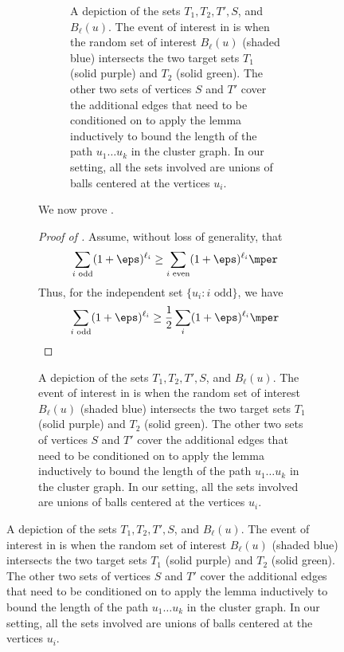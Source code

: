 \documentclass[11pt,letterpaper]{article}
\begin{document}
\begin{figure}
\begin{figure}
\begin{figure}[ht]
        \caption{A depiction of the sets $T_1, T_2, T', S$, and $B_{\ell}(u)$. 
        The event of interest in  is when the random set of interest $B_{\ell}(u)$ (shaded blue) intersects the two target sets $T_1$ (solid purple) and $T_2$ (solid green). 
        The other two sets of vertices $S$ and $T'$ cover the additional edges that need to be conditioned on to apply the lemma inductively to bound the length of the path $u_1\ldots u_k$ in the cluster graph. 
        In our setting, all the sets involved are unions of balls centered at the vertices $u_i$.
        }

        \label{fig:overlapping-balls}
    \end{figure}

    We now prove .
    \begin{proof}[Proof of ]
        Assume, without loss of generality, that
        $$\sum_{i\text{ odd}}(1+\eps)^{\ell_i} \ge \sum_{i\text{ even}} (1+\eps)^{\ell_i}\mper$$
        Thus, for the independent set $\{u_i:i\text{ odd}\}$, we have 
        $$\sum_{i\text{ odd}} (1+\eps)^{\ell_i} \ge \frac{1}{2} \sum_{i} (1+\eps)^{\ell_i}\mper$$ 


\end{proof}
\end{figure}
\end{figure}
\end{document}
